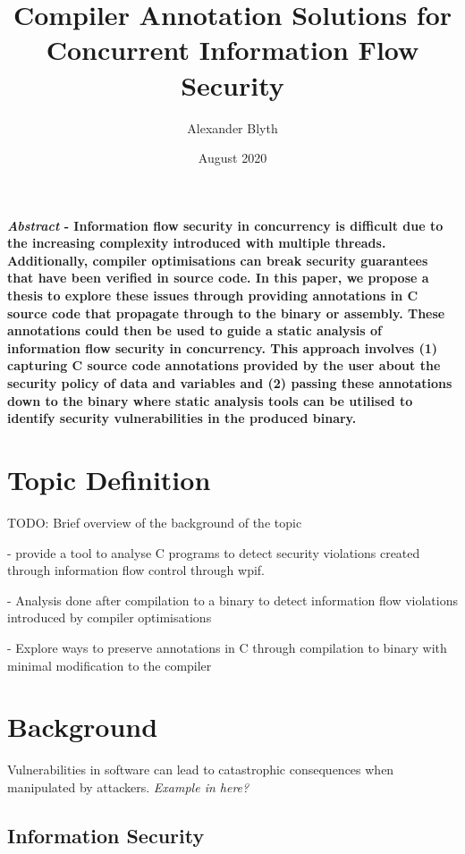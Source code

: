 \documentclass[twocolumn]{article}
\title{Compiler Annotation Solutions for Concurrent Information Flow Security}
\author{Alexander Blyth}
\date{August 2020}
\begin{document}
\maketitle



\textbf{\textit{Abstract} - Information flow security in concurrency is difficult due to the increasing complexity introduced with multiple threads. Additionally, compiler optimisations can break security guarantees that have been verified in source code. In this paper, we propose a thesis to explore these issues through providing annotations in C source code that propagate through to the binary or assembly. These annotations could then be used to guide a static analysis of information flow security in concurrency. This approach involves (1) capturing C source code annotations provided by the user about the security policy of data and variables and (2) passing these annotations down to the binary where static analysis tools can be utilised to identify security vulnerabilities in the produced binary. }

\section{Topic Definition}
TODO: Brief overview of the background of the topic

- provide a tool to analyse C programs to detect security violations created through information flow control through wpif.

- Analysis done after compilation to a binary to detect information flow violations introduced by compiler optimisations

- Explore ways to preserve annotations in C through compilation to binary with minimal modification to the compiler

\section{Background}
Vulnerabilities in software can lead to catastrophic consequences when manipulated by attackers. \textit{Example in here?}

\subsection{Information Security}
\end{document}
